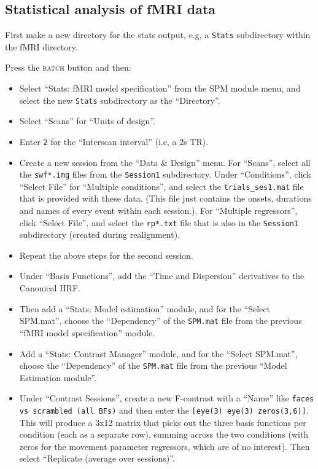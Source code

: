 \subsection{Statistical analysis of fMRI data}

First make a new directory for the stats output, e.g, a \texttt{Stats} subdirectory within the fMRI directory.

Press the \textsc{batch} button and then:

\begin{itemize}

\item Select ``Stats: fMRI model specification'' from the SPM module menu, and select the new \texttt{Stats} subdirectory as the ``Directory''.

\item Select ``Scans'' for ``Units of design''.

\item Enter \texttt{2} for the ``Interscan interval'' (i.e, a 2s TR).

\item Create a new session from the ``Data \& Design'' menu. For ``Scans'', select all the \texttt{swf*.img} files from the \texttt{Session1} subdirectory. Under ``Conditions'', click ``Select File'' for ``Multiple conditions'', and select the \texttt{trials\_ses1.mat} file that is provided with these data. (This file just contains the onsets, durations and names of every event within each session.). For ``Multiple regressors'', click ``Select File'', and select the \texttt{rp*.txt} file that is also in the \texttt{Session1} subdirectory (created during realignment).

\item Repeat the above steps for the second session.

\item Under ``Basis Functions'', add the ``Time and Dispersion'' derivatives to the Canonical HRF.

\item Then add a ``Stats: Model estimation'' module, and for the ``Select SPM.mat'', choose the ``Dependency'' of the \texttt{SPM.mat} file from the previous ``fMRI model specification'' module.

\item Add a ``Stats: Contrast Manager'' module, and for the ``Select SPM.mat'', choose the ``Dependency'' of the \texttt{SPM.mat} file from the previous ``Model Estimation module''.

\item Under ``Contrast Sessions'', create a new F-contrast with a ``Name'' like \texttt{faces vs scrambled (all BFs)} and then enter the \matlab \texttt{[eye(3) eye(3) zeros(3,6)]}. This will produce a 3x12 matrix that picks out the three basis functions per condition (each as a separate row), summing across the two conditions (with zeros for the movement parameter regressors, which are of no interest). Then select ``Replicate (average over sessions)''.


\end{itemize}
